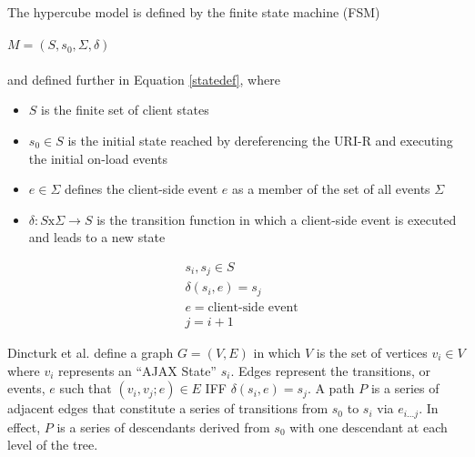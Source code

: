 \documentclass{sig-alternate}
\begin{document}
The hypercube model is defined by the finite state machine (FSM) 
\\\\
\noindent$M = (S, s_0, \Sigma, \delta)$ 
\\\\
\noindent and defined further in Equation \ref{statedef}, where

\begin{itemize}
\item $S$ is the finite set of client states
\item $s_0 \in S$ is the initial state reached by dereferencing the URI-R and executing the initial on-load events
\item $e \in \Sigma$ defines the client-side event $e$ as a member of the set of all events $\Sigma$
\item $\delta : S \text{x} \Sigma \rightarrow S$ is the transition function in which a client-side event is executed and leads to a new state
\end{itemize}

\begin{equation}
\begin{split} 
&s_i, s_j \in S\\
&\delta(s_i, e) = s_j\\
&e = \text{client-side event}\\
&j = i+1
\end{split}
\label{statedef}
\end{equation}


Dincturk et al. define a graph $G=(V, E)$ in which $V$ is the set of vertices $v_i \in V$ where $v_i$ represents an ``AJAX State'' $s_i$. Edges represent the transitions, or events, $e$ such that $(v_i, v_j;e) \in E$ IFF $\delta(s_i, e)=s_j$. A path $P$ is a series of adjacent edges that constitute a series of transitions from $s_0$ to $s_i$ via $e_{i...j}$. In effect, $P$ is a series of descendants derived from $s_0$ with one descendant at each level of the tree.
\end{document}
